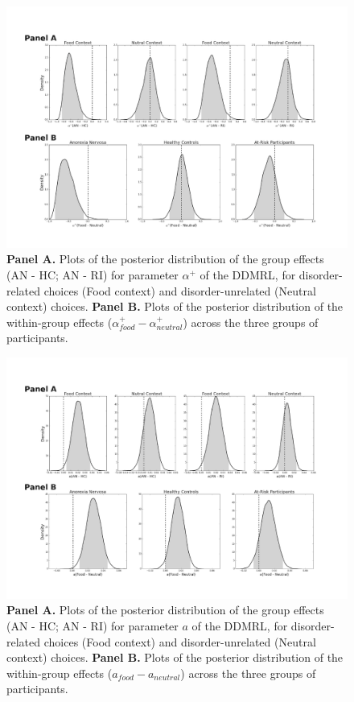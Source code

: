 \documentclass[
  man,floatsintext]{apa6}
\begin{document}
\begin{figure}

{\centering \includegraphics[width=0.99\linewidth]{img/pics/alpha_pos_param} 

}

\caption{\textbf{Panel A.} Plots of the posterior distribution of the group effects (AN - HC; AN - RI) for parameter \(\alpha^+\) of the DDMRL, for disorder-related choices (Food context) and disorder-unrelated (Neutral context) choices. \textbf{Panel B.} Plots of the posterior distribution of the within-group effects (\(\alpha^+_{food} - \alpha^+_{neutral}\)) across the three groups of participants.}\label{fig:alpha-param}
\end{figure}



\begin{figure}

{\centering \includegraphics[width=0.99\linewidth]{img/pics/a_param} 

}

\caption{\textbf{Panel A.} Plots of the posterior distribution of the group effects (AN - HC; AN - RI) for parameter \(a\) of the DDMRL, for disorder-related choices (Food context) and disorder-unrelated (Neutral context) choices. \textbf{Panel B.} Plots of the posterior distribution of the within-group effects (\(a_{food} - a_{neutral}\)) across the three groups of participants.}\label{fig:a-param}
\end{figure}
\end{document}
